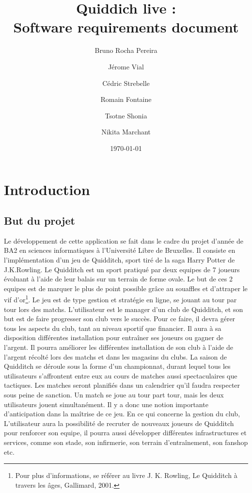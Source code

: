 \documentclass[a4paper]{article}
\title{Quiddich live : \\Software requirements document}
\author{Bruno Rocha Pereira \and Jérome Vial \and Cédric Strebelle \and
Romain Fontaine \and Tsotne Shonia \and Nikita Marchant}
\date{\today}
\begin{document}
\maketitle

\section{Introduction}
\subsection{But du projet}
Le développement de cette application se fait dans le cadre du projet d'année de BA2 en sciences informatiques à l'Université Libre de Bruxelles. Il consiste en l'implémentation d'un jeu de Quidditch, sport tiré de la saga Harry Potter de J.K.Rowling. 
Le Quidditch est un sport pratiqué par deux \glspl{equipe} de 7 \glspl{joueur} évoluant à l'aide de leur balais sur un terrain de forme ovale. Le but de ces 2 \glspl{equipe} est de marquer le plus de point possible grâce au souaffles et d'attraper le vif d'or\footnote{Pour plus d'informations, se référer au livre J. K. Rowling, Le Quidditch à travers les âges, Gallimard, 2001.}. 
Le jeu est de type gestion et stratégie en ligne, se jouant au tour par tour lors des matchs. L'\gls{utilisateur} est le \gls{manager} d'un \gls{club} de Quidditch, et son but est de faire progresser son \gls{club} vers le succès. Pour ce faire, il devra gérer tous les aspects du \gls{club}, tant au niveau sportif que financier. Il aura à sa disposition différentes installation pour entraîner ses \glspl{joueur} ou gagner de l'argent. Il pourra améliorer les différentes installation de son \gls{club} à l'aide de l'argent
récolté lors des matchs et dans les magasins du \glspl{club}. La saison de Quidditch se déroule sous la forme d'un championnat, durant lequel tous les \glspl{utilisateur} s'affrontent entre eux au cours de matches aussi spectaculaires que tactiques. Les matches seront planifiés dans un calendrier qu'il faudra respecter sous peine de sanction. Un match se joue au tour part tour, mais les deux \glspl{utilisateur} jouent simultanément. Il y a donc une notion importante d'anticipation dans la maîtrise de
ce jeu. En ce qui concerne la gestion du \gls{club}, L'\gls{utilisateur} aura la possibilité de recruter de nouveaux \glspl{joueur} de Quidditch pour renforcer son \gls{equipe}, il pourra aussi développer différentes infrastructures et services, comme son stade, son infirmerie, son terrain d'entraînement, son fanshop etc.
\end{document}
